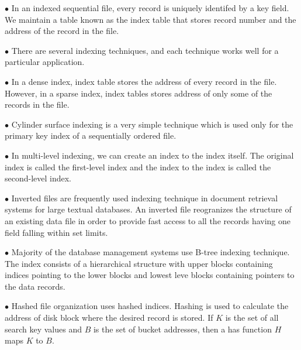 \vskip 3mm
\qquad$\bullet$ In an indexed sequential file, every record is uniquely identifed by a key field. We maintain a table known as the index table that stores record number and the address of the record in the file.

\vskip 3mm
\qquad$\bullet$ There are several indexing techniques, and each technique works well for a particular application.

\vskip 3mm
\qquad$\bullet$ In a dense index, index table stores the address of every record in the file. However, in a sparse index, index tables stores address of only some of the records in the file.

\vskip 3mm
\qquad$\bullet$ Cylinder surface indexing is a very simple technique which is used only for the primary key index of a sequentially ordered file.

\vskip 3mm
\qquad$\bullet$ In multi-level indexing, we can create an index to the index itself. The original index is called the first-level index and the index to the index is called the second-level index.

\vskip 3mm
\qquad$\bullet$ Inverted files are frequently used indexing technique in document retrieval systems for large textual databases. An inverted file reogranizes the structure of an existing data file in order to provide fast access to all the records having one field falling within set limits.

\vskip 3mm
\qquad$\bullet$ Majority of the database management systems use B-tree indexing technique. The index consists of a hierarchical structure with upper blocks containing indices pointing to the lower blocks and lowest leve blocks containing pointers to the data records.

\vskip 3mm
\qquad$\bullet$ Hashed file organization uses hashed indices. Hashing is used to calculate the address of disk block where the desired record is stored. If $K$ is the set of all search key values and $B$ is the set of bucket addresses, then a has function $H$ maps $K$ to $B$.





\vfill\eject
\bye
